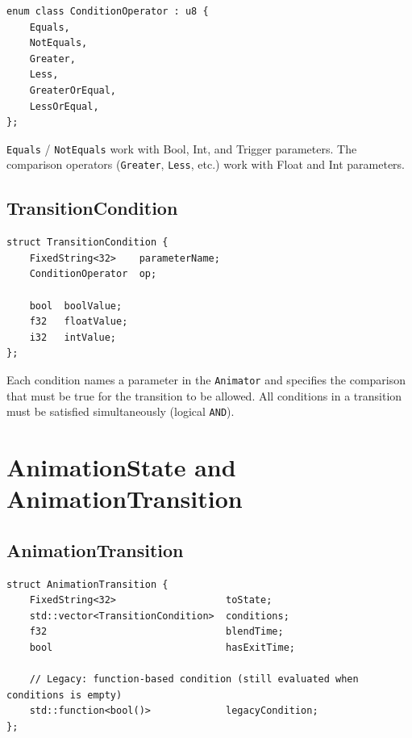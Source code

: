 \begin{lstlisting}
enum class ConditionOperator : u8 {
    Equals,
    NotEquals,
    Greater,
    Less,
    GreaterOrEqual,
    LessOrEqual,
};
\end{lstlisting}

\texttt{Equals} / \texttt{NotEquals} work with Bool, Int, and Trigger
parameters. The comparison operators (\texttt{Greater}, \texttt{Less}, etc.)
work with Float and Int parameters.

\subsection{TransitionCondition}

\begin{lstlisting}
struct TransitionCondition {
    FixedString<32>    parameterName;
    ConditionOperator  op;

    bool  boolValue;
    f32   floatValue;
    i32   intValue;
};
\end{lstlisting}

Each condition names a parameter in the \texttt{Animator} and specifies the
comparison that must be true for the transition to be allowed. All conditions
in a transition must be satisfied simultaneously (logical \texttt{AND}).

\section{AnimationState and AnimationTransition}

\subsection{AnimationTransition}

\begin{lstlisting}
struct AnimationTransition {
    FixedString<32>                   toState;
    std::vector<TransitionCondition>  conditions;
    f32                               blendTime;
    bool                              hasExitTime;

    // Legacy: function-based condition (still evaluated when conditions is empty)
    std::function<bool()>             legacyCondition;
};
\end{lstlisting}

